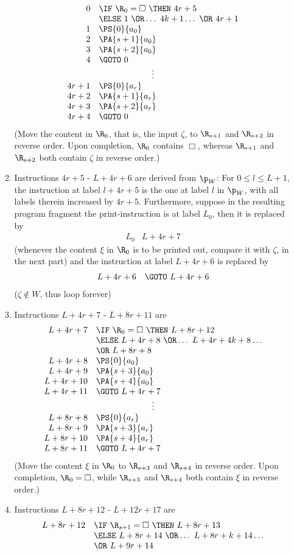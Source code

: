 \begin{enumerate}[1.]
\begin{enumerate}[(1)]
\[\begin{array}{rl}
0 & \IF \ \R_0 = \Box \ \THEN \ 4r + 5 \cr
\ & \ELSE \ 1 \ \OR \ldots \ 4k + 1 \ldots \ \OR \ 4r + 1 \cr
1 & \PS{0}{a_0} \cr
2 & \PA{s + 1}{a_0} \cr
3 & \PA{s + 2}{a_0} \cr
4 & \GOTO \  0 \cr
\multicolumn{2}{c}{\vdots} \cr
4r + 1 & \PS{0}{a_r} \cr
4r + 2 & \PA{s + 1}{a_r} \cr
4r + 3 & \PA{s + 2}{a_r} \cr
4r + 4 & \GOTO \ 0
\end{array}
\]
(Move the content in $\R_0$, that is, the input $\zeta$, to $\R_{s + 1}$ and $\R_{s + 2}$ in reverse order. Upon completion, $\R_0$ contains $\Box$, whereas $\R_{s + 1}$ and $\R_{s + 2}$ both contain $\zeta$ in reverse order.)
\item Instructions $4r + 5$ - $L + 4r + 6$ are derived from $\p_W$: For $0 \leq l \leq L + 1$, the instruction at label $l + 4r + 5$ is the one at label $l$ in $\p_W$, with all labels therein increased by $4r + 5$. Furthermore, suppose in the resulting program fragment the print-instruction is at label $L_0$, then it is replaced by
\[
\begin{array}{rl}
L_0 & L + 4r + 7
\end{array}
\]
(whenever the content $\xi$ in $\R_0$ is to be printed out, compare it with $\zeta$, in the next part)
and the instruction at label $L + 4r + 6$ is replaced by
\[
\begin{array}{rl}
L + 4r + 6 & \GOTO \ L + 4r + 6
\end{array}
\]
($\zeta \not\in W$, thus loop forever)
\item Instructions $L + 4r + 7$ - $L + 8r + 11$ are
\[
\begin{array}{rl}
L + 4r + 7 & \IF \ \R_0 = \Box \ \THEN \ L + 8r + 12 \cr
\ & \ELSE \ L + 4r + 8 \ \OR \ldots \ L + 4r + 4k + 8 \ldots \cr
\ & \OR \ L + 8r + 8 \cr
L + 4r + 8 & \PS{0}{a_0} \cr
L + 4r + 9 & \PA{s + 3}{a_0} \cr
L + 4r + 10 & \PA{s + 4}{a_0} \cr
L + 4r + 11 & \GOTO \ L + 4r + 7 \cr
\multicolumn{2}{c}{\vdots} \cr
L + 8r + 8 & \PS{0}{a_r} \cr
L + 8r + 9 & \PA{s + 3}{a_r} \cr
L + 8r + 10 & \PA{s + 4}{a_r} \cr
L + 8r + 11 & \GOTO \ L + 4r + 7
\end{array}
\]
(Move the content $\xi$ in $\R_0$ to $\R_{s + 3}$ and $\R_{s + 4}$ in reverse order. Upon completion, $\R_0 = \Box$, while $\R_{s + 3}$ and $\R_{s + 4}$ both contain $\xi$ in reverse order.)
\item Instructions $L + 8r + 12$ - $L + 12r + 17$ are
\[
\begin{array}{rl}
L + 8r + 12 & \IF \ \R_{s + 1} = \Box \ \THEN \ L + 8r + 13 \cr
\ & \ELSE \ L + 8r + 14 \ \OR \ldots \ L + 8r + k + 14 \ldots \cr
\ & \OR \ L + 9r + 14 \cr

\end{array}\]
\end{enumerate}
\end{enumerate}
